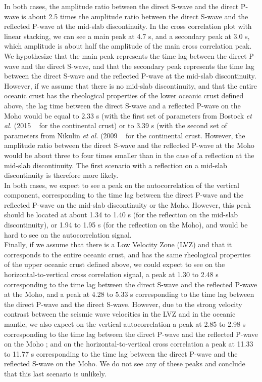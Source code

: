 \documentclass[workdone.tex]{subfiles}
\begin{document}
In both cases, the amplitude ratio between the direct S-wave and the direct P-wave is about 2.5 times the amplitude ratio between the direct S-wave and the reflected P-wave at the mid-slab discontinuity. In the cross correlation plot with linear stacking, we can see a main peak at 4.7 s, and a secondary peak at 3.0 s, which amplitude is about half the amplitude of the main cross correlation peak. We hypothesize that the main peak represents the time lag between the direct P-wave and the direct S-wave, and that the secondary peak represents the time lag between the direct S-wave and the reflected P-wave at the mid-slab discontinuity. \\

However, if we assume that there is no mid-slab discontinuity, and that the entire oceanic crust has the rheological properties of the lower oceanic crust defined above, the lag time between the direct S-wave and a reflected P-wave on the Moho would be equal to 2.33 s (with the first set of parameters from Bostock \textit{et al.} (2015 ~\cite{BOS_2015} for the continental crust) or to 3.39 s (with the second set of parameters from Nikulin \textit{et al.} (2009 ~\cite{NIK_2009} for the continental crust. However, the amplitude ratio between the direct S-wave and the reflected P-wave at the Moho would be about three to four times smaller than in the case of a reflection at the mid-slab discontinuity. The first scenario with a reflection on a mid-slab discontinuity is therefore more likely. \\

In both cases, we expect to see a peak on the autocorrelation of the vertical component, corresponding to the time lag between the direct P-wave and the reflected P-wave on the mid-slab discontinuity or the Moho. However, this peak should be located at about 1.34 to 1.40 s (for the reflection on the mid-slab discontinuity), or 1.94 to 1.95 s (for the reflection on the Moho), and would be hard to see on the autocorrelation signal. \\

Finally, if we assume that there is a Low Velocity Zone (LVZ) and that it corresponds to the entire oceanic crust, and has the same rheological properties of the upper oceanic crust defined above, we could expect to see on the horizontal-to-vertical cross correlation signal, a peak at 1.30 to 2.48 s corresponding to the time lag between the direct S-wave and the reflected P-wave at the Moho, and a peak at 4.28 to 5.33 s corresponding to the time lag between the direct P-wave and the direct S-wave. However, due to the strong velocity contrast between the seismic wave velocities in the LVZ and in the oceanic mantle, we also expect on the vertical autocorrelation a peak at 2.85 to 2.98 s corresponding to the time lag between the direct P-wave and the reflected P-wave on the Moho ; and on the horizontal-to-vertical cross correlation a peak at 11.33 to 11.77 s corresponding to the time lag between the direct P-wave and the reflected S-wave on the Moho. We do not see any of these peaks and conclude that this last scenario is unlikely.
\end{document}
